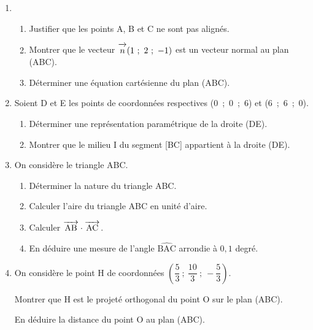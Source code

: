 \documentclass[10pt,a4paper]{article}
\newcommand{\vect}[1]{\overrightarrow{\,\mathstrut#1\,}}
\begin{document}
\bigskip

\begin{enumerate}
\item 
	\begin{enumerate}
		\item Justifier que les points A, B et C ne sont pas alignés.
		\item Montrer que le vecteur $\vect{n}(1~;~2~;~-1)$ est
un vecteur normal au plan (ABC).
		\item Déterminer une équation cartésienne du plan (ABC).
	\end{enumerate}
\item Soient D et E les points de coordonnées respectives (0~;~0~;~6) et (6~;~6~;~0).
	\begin{enumerate}
		\item Déterminer une représentation paramétrique de la droite (DE).
		\item Montrer que le milieu I du segment [BC] appartient à la droite (DE).
	\end{enumerate}	
\item On considère le triangle ABC.
	\begin{enumerate}
		\item Déterminer la nature du triangle ABC.
		\item Calculer l'aire du triangle ABC en unité d'aire.
		\item Calculer $\vect{\text{AB}} \cdot \vect{\text{AC}}$.
		\item En déduire une mesure de l'angle $\widehat{\text{BAC}}$ arrondie à $0,1$ degré.
	\end{enumerate}	
\item On considère le point H de coordonnées $\left(\dfrac53~;~\dfrac{10}{3}~;~- \dfrac53\right)$.

Montrer que H est le projeté orthogonal du point O sur le plan (ABC). 

En déduire la distance du point O au plan (ABC).
\end{enumerate}
\newpage
\hypertarget{NCaledo1}{}

\label{NCaledo1}

\pagestyle{fancy}
\thispagestyle{empty}
\end{document}
